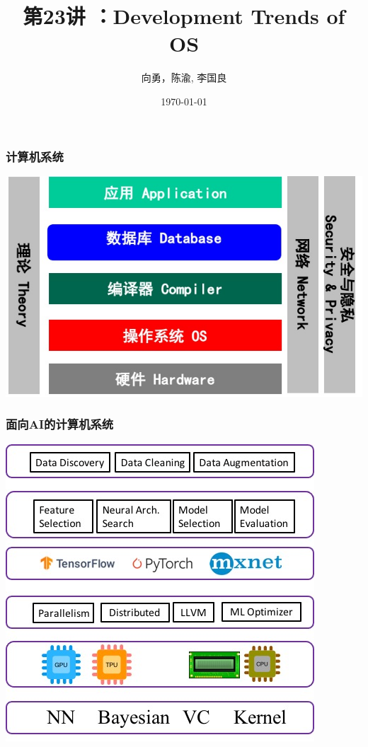 


\title[第23讲]{第23讲 ：Development Trends of OS} %
\author{向勇，陈渝, 李国良} %
\date{\today} %




\begin{frame}
\titlepage %
\end{frame}


\begin{frame}
\frametitle{计算机系统} 		
\centering	
\includegraphics[width=.75\textwidth]{fig23/cs.jpg}
\end{frame}

\begin{frame}
\frametitle{面向AI的计算机系统} 		
\centering	
\includegraphics[width=.5\textwidth]{fig23/aios.jpg}
\end{frame}


